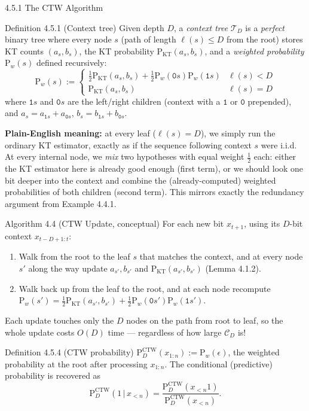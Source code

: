 \documentclass[aspectratio=169,10pt]{beamer}
\newcommand{\PKT}{\mathrm{P}_{\mathrm{KT}}}
\newcommand{\Pw}{\mathrm{P}_w}
\begin{document}
\begin{frame}[allowframebreaks]{4.5.1 The CTW Algorithm}
\begin{block}{Definition 4.5.1 (Context tree)}
Given depth $D$, a \emph{context tree} $\mathcal T_D$ is a \emph{perfect} binary tree where
every node $s$ (path of length $\ell(s)\le D$ from the root) stores KT counts $(a_s,b_s)$,
the KT probability $\PKT(a_s,b_s)$, and a \emph{weighted probability} $\Pw(s)$ defined
recursively:
$$
\Pw(s) := \begin{cases}
\tfrac12\PKT(a_s,b_s) + \tfrac12\Pw(\mathtt0 s)\Pw(\mathtt1 s) & \ell(s)<D\\
\PKT(a_s,b_s) & \ell(s)=D
\end{cases}
$$
where $\mathtt1 s$ and $\mathtt0 s$ are the left/right children (context with a $\mathtt1$
or $\mathtt0$ prepended), and $a_s=a_{\mathtt1 s}+a_{\mathtt0 s}$,
$b_s=b_{\mathtt1 s}+b_{\mathtt0 s}$.
\end{block}
\textbf{Plain-English meaning:} at every leaf ($\ell(s)=D$), we simply run the ordinary KT
estimator, exactly as if the sequence following context $s$ were i.i.d. At every internal
node, we \emph{mix} two hypotheses with equal weight $\tfrac12$ each: either the KT
estimator here is already good enough (first term), or we should look one bit deeper into
the context and combine the (already-computed) weighted probabilities of both children
(second term). This mirrors exactly the redundancy argument from Example 4.4.1.

\framebreak

\begin{block}{Algorithm 4.4 (CTW Update, conceptual)}
For each new bit $x_{t+1}$, using its $D$-bit context $x_{t-D+1:t}$:
\begin{enumerate}
\item Walk from the root to the leaf $s$ that matches the context, and at every node $s'$
along the way update $a_{s'},b_{s'}$ and $\PKT(a_{s'},b_{s'})$ (Lemma 4.1.2).
\item Walk back up from the leaf to the root, and at each node recompute
$\Pw(s')=\tfrac12\PKT(a_{s'},b_{s'})+\tfrac12\Pw(\mathtt0 s')\Pw(\mathtt1 s')$.
\end{enumerate}
\end{block}
Each update touches only the $D$ nodes on the path from root to leaf, so the whole update
costs $O(D)$ time — regardless of how large $\mathcal C_D$ is!

\begin{block}{Definition 4.5.4 (CTW probability)}
$\mathrm{P}_D^{\mathrm{CTW}}(x_{1:n}) := \Pw(\epsilon)$, the weighted probability at the
root after processing $x_{1:n}$. The conditional (predictive) probability is recovered as
$$
\mathrm{P}_D^{\mathrm{CTW}}(1\,|\,x_{<n}) = \frac{\mathrm{P}_D^{\mathrm{CTW}}(x_{<n}1)}{\mathrm{P}_D^{\mathrm{CTW}}(x_{<n})}.
$$
\end{block}


\end{frame}
\end{document}
